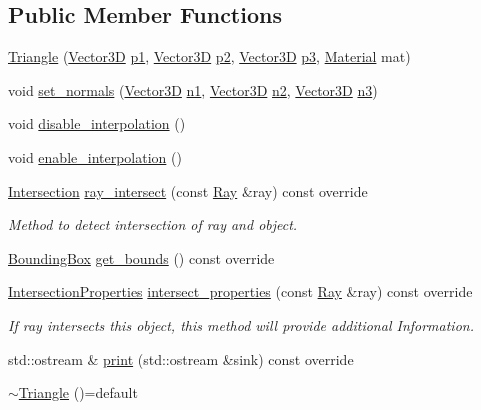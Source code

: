 \subsection*{Public Member Functions}
\begin{DoxyCompactItemize}
\item 
\hyperlink{classTriangle_a4a1cc7d9d62014eb2453d18bbd05608f}{Triangle} (\hyperlink{classVector3D}{Vector3D} \hyperlink{classTriangle_a0461ba6ca1a0e1aa84062f93eacbe8b8}{p1}, \hyperlink{classVector3D}{Vector3D} \hyperlink{classTriangle_aa15acbc4f123f3e9e75e574566c2679a}{p2}, \hyperlink{classVector3D}{Vector3D} \hyperlink{classTriangle_a600c7366c1dad8996026742eb12434c6}{p3}, \hyperlink{classMaterial}{Material} mat)
\item 
void \hyperlink{classTriangle_a884c08e85751ea6204351718d3411034}{set\+\_\+normals} (\hyperlink{classVector3D}{Vector3D} \hyperlink{classTriangle_a51a16cfc88994c78e31340029bac777f}{n1}, \hyperlink{classVector3D}{Vector3D} \hyperlink{classTriangle_ab5786d87c9f548c1e8bb5937977dd0af}{n2}, \hyperlink{classVector3D}{Vector3D} \hyperlink{classTriangle_ae91046acca032af6fb931497127f8a7e}{n3})
\item 
void \hyperlink{classTriangle_a4465d15c66b5a61bfe3441b4e0676686}{disable\+\_\+interpolation} ()
\item 
void \hyperlink{classTriangle_a1a81c94f82103c8f1b81e006d8b03356}{enable\+\_\+interpolation} ()
\item 
\hyperlink{classIntersection}{Intersection} \hyperlink{classTriangle_a1ee77d1d4ddeae939e08711b30dbf4f0}{ray\+\_\+intersect} (const \hyperlink{classRay}{Ray} \&ray) const override
\begin{DoxyCompactList}\small\item\em Method to detect intersection of ray and object. \end{DoxyCompactList}\item 
\hyperlink{classBoundingBox}{Bounding\+Box} \hyperlink{classTriangle_ac93216ac2308504ab7dd7679e6b84937}{get\+\_\+bounds} () const override
\item 
\hyperlink{classIntersectionProperties}{Intersection\+Properties} \hyperlink{classTriangle_abbca4150897005e47c87758833479c87}{intersect\+\_\+properties} (const \hyperlink{classRay}{Ray} \&ray) const override
\begin{DoxyCompactList}\small\item\em If ray intersects this object, this method will provide additional Information. \end{DoxyCompactList}\item 
std\+::ostream \& \hyperlink{classTriangle_af5089786289dbeb3a5f41affb4edb569}{print} (std\+::ostream \&sink) const override
\item 
\hyperlink{classTriangle_a2b4c058428898080754e39009819ca38}{$\sim$\+Triangle} ()=default
\end{DoxyCompactItemize}
